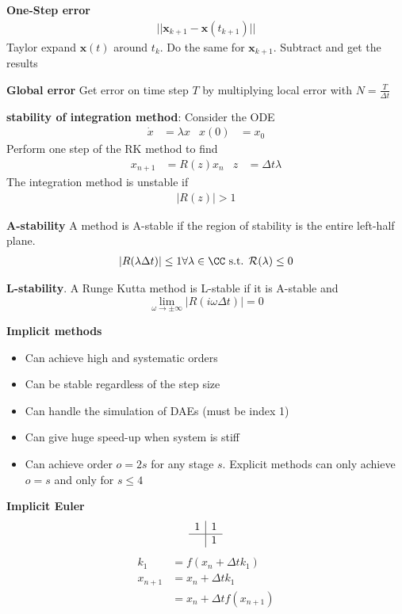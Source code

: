 \textbf{One-Step error}
\begin{align*}
    ||\bm{x}_{k+1}-\bm{x}(t_{k+1})||
\end{align*}
Taylor expand \(\bm{x}(t)\) around \(t_k\). Do the same for \(\bm{x}_{k+1}\). Subtract and get the results
\newline

\textbf{Global error}
Get error on time step \(T\) by multiplying local error with \(N=\frac{T}{\Delta t}\)
\newline

\textbf{stability of integration method}: Consider the ODE
\begin{align*}
    \dot{x}&=\lambda x & x(0) &= x_0
\end{align*}
Perform one step of the RK method to find
\begin{align*}
    x_{n+1} &= R(z)x_n & z &= \Delta t \lambda
\end{align*}
The integration method is unstable if
\begin{align*}
    |R(z)| > 1
\end{align*}

\textbf{A-stability}
A method is A-stable if the region of stability is the entire left-half plane.
\begin{align*}
    |R(\lambda\Delta t)|\leq 1 \forall \lambda \in \CC \textrm{ s.t. } \mathcal{R}(\lambda) \leq 0
\end{align*}

\textbf{L-stability}.
A Runge Kutta method is L-stable if it is A-stable and
\[\lim_{\omega \rightarrow \pm \infty}|R(i\omega \Delta t)|= 0\]

\textbf{Implicit methods}
\begin{itemize}
    \item Can achieve high and systematic orders
    \item Can be stable regardless of the step size 
    \item Can handle the simulation of DAEs (must be index 1)
    \item Can give huge speed-up when system is stiff
    \item Can achieve order \(o=2s\) for any stage \(s\). Explicit methods can only achieve \(o=s\) and only for \(s\leq4\)
\end{itemize}

\textbf{Implicit Euler}
\begin{align*}
\begin{array}{c|cc}
    1 & 1\\ \hline
     & 1
\end{array}
\end{align*}
\begin{align*}
    k_1 &= f(x_n + \Delta t k_1) \\
    x_{n+1} &= x_n + \Delta t k_1 \\
    &= x_n + \Delta t f(x_{n+1})
\end{align*}

